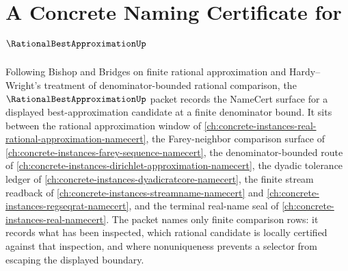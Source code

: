 \chapter{A Concrete Naming Certificate for $\RationalBestApproximationUp$}
\label{ch:concrete-instances-rational-best-approximation-namecert}

Following Bishop and Bridges on finite rational approximation and Hardy--Wright's treatment of denominator-bounded rational comparison, the $\RationalBestApproximationUp$ packet records the NameCert surface for a displayed best-approximation candidate at a finite denominator bound. It sits between the rational approximation window of \autoref{ch:concrete-instances-real-rational-approximation-namecert}, the Farey-neighbor comparison surface of \autoref{ch:concrete-instances-farey-sequence-namecert}, the denominator-bounded route of \autoref{ch:concrete-instances-dirichlet-approximation-namecert}, the dyadic tolerance ledger of \autoref{ch:concrete-instances-dyadicratcore-namecert}, the finite stream readback of \autoref{ch:concrete-instances-streamname-namecert} and \autoref{ch:concrete-instances-regseqrat-namecert}, and the terminal real-name seal of \autoref{ch:concrete-instances-real-namecert}. The packet names only finite comparison rows: it records what has been inspected, which rational candidate is locally certified against that inspection, and where nonuniqueness prevents a selector from escaping the displayed boundary.

